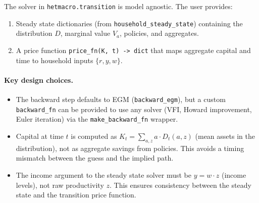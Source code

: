 \documentclass[12pt]{article}
\begin{document}
The solver in \texttt{hetmacro.transition} is model agnostic. The user provides:
\begin{enumerate}[nosep]
    \item Steady state dictionaries (from \texttt{household\_steady\_state}) containing the distribution $D$, marginal value $V_a$, policies, and aggregates.
    \item A price function \texttt{price\_fn(K, t) -> dict} that maps aggregate capital and time to household inputs $\{r, y, w\}$.
\end{enumerate}

\paragraph{Key design choices.}
\begin{itemize}[nosep]
    \item The backward step defaults to EGM (\texttt{backward\_egm}), but a custom \texttt{backward\_fn} can be provided to use any solver (VFI, Howard improvement, Euler iteration) via the \texttt{make\_backward\_fn} wrapper.
    \item Capital at time $t$ is computed as $K_t = \sum_{a,z} a \cdot D_t(a,z)$ (mean assets in the distribution), not as aggregate savings from policies. This avoids a timing mismatch between the guess and the implied path.
    \item The income argument to the steady state solver must be $y = w \cdot z$ (income levels), not raw productivity $z$. This ensures consistency between the steady state and the transition price function.
\end{itemize}

\end{document}
